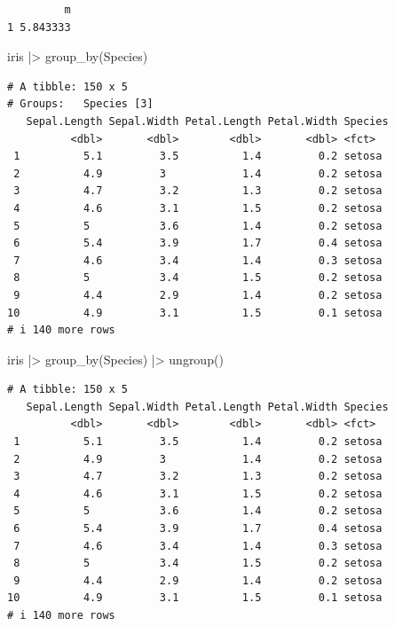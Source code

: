 \documentclass[
  letterpaper,
  DIV=11,
  numbers=noendperiod]{scrreprt}
\newenvironment{Shaded}{\begin{snugshade}}{\end{snugshade}}
\newcommand{\FunctionTok}[1]{\textcolor[rgb]{0.28,0.35,0.67}{#1}}
\newcommand{\NormalTok}[1]{\textcolor[rgb]{0.00,0.23,0.31}{#1}}
\newcommand{\SpecialCharTok}[1]{\textcolor[rgb]{0.37,0.37,0.37}{#1}}
\begin{document}
\begin{verbatim}
         m
1 5.843333
\end{verbatim}

\begin{Shaded}
\begin{Highlighting}[]
\NormalTok{iris }\SpecialCharTok{|\textgreater{}} \FunctionTok{group\_by}\NormalTok{(Species)}
\end{Highlighting}
\end{Shaded}

\begin{verbatim}
# A tibble: 150 x 5
# Groups:   Species [3]
   Sepal.Length Sepal.Width Petal.Length Petal.Width Species
          <dbl>       <dbl>        <dbl>       <dbl> <fct>  
 1          5.1         3.5          1.4         0.2 setosa 
 2          4.9         3            1.4         0.2 setosa 
 3          4.7         3.2          1.3         0.2 setosa 
 4          4.6         3.1          1.5         0.2 setosa 
 5          5           3.6          1.4         0.2 setosa 
 6          5.4         3.9          1.7         0.4 setosa 
 7          4.6         3.4          1.4         0.3 setosa 
 8          5           3.4          1.5         0.2 setosa 
 9          4.4         2.9          1.4         0.2 setosa 
10          4.9         3.1          1.5         0.1 setosa 
# i 140 more rows
\end{verbatim}

\begin{Shaded}
\begin{Highlighting}[]
\NormalTok{iris }\SpecialCharTok{|\textgreater{}} \FunctionTok{group\_by}\NormalTok{(Species) }\SpecialCharTok{|\textgreater{}} \FunctionTok{ungroup}\NormalTok{()}
\end{Highlighting}
\end{Shaded}

\begin{verbatim}
# A tibble: 150 x 5
   Sepal.Length Sepal.Width Petal.Length Petal.Width Species
          <dbl>       <dbl>        <dbl>       <dbl> <fct>  
 1          5.1         3.5          1.4         0.2 setosa 
 2          4.9         3            1.4         0.2 setosa 
 3          4.7         3.2          1.3         0.2 setosa 
 4          4.6         3.1          1.5         0.2 setosa 
 5          5           3.6          1.4         0.2 setosa 
 6          5.4         3.9          1.7         0.4 setosa 
 7          4.6         3.4          1.4         0.3 setosa 
 8          5           3.4          1.5         0.2 setosa 
 9          4.4         2.9          1.4         0.2 setosa 
10          4.9         3.1          1.5         0.1 setosa 
# i 140 more rows
\end{verbatim}
\end{document}
